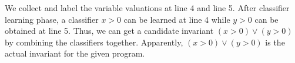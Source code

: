 We collect and label the variable valuations at line 4 and line 5.
After classifier learning phase, a classifier $x>0$ can be learned at line 4 while $y>0$ can be obtained at line 5.
Thus, we can get a candidate invariant $(x>0) \vee (y>0)$ by combining the classifiers together.
Apparently, $(x>0) \vee (y>0)$ is the actual invariant for the given program.

